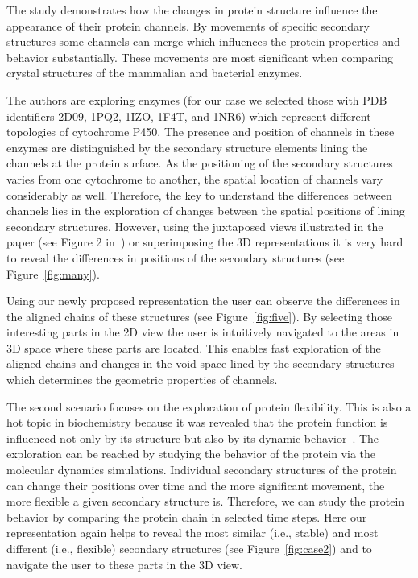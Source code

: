 \documentclass[twocolumn]{bmcart}%
\begin{document}
The study demonstrates how the changes in protein structure influence the appearance of their protein channels.
By movements of specific secondary structures some channels can merge which influences the protein properties and behavior substantially.
These movements are most significant when comparing crystal structures of the mammalian and bacterial enzymes.

The authors are exploring enzymes (for our case we selected those with PDB identifiers 2D09, 1PQ2, 1IZO, 1F4T, and 1NR6) which represent different topologies of cytochrome P450. 
The presence and position of channels in these enzymes are distinguished by the secondary structure elements lining the channels at the protein surface. 
As the positioning of the secondary structures varies from one cytochrome to another, the spatial location of channels vary considerably as well.
Therefore, the key to understand the differences between channels lies in the exploration of changes between the spatial positions of lining secondary structures.
However, using the juxtaposed views illustrated in the paper (see Figure 2 in~\cite{Cojocaru2007}) or superimposing the 3D representations it is very hard to reveal the differences in positions of the secondary structures (see Figure~\ref{fig:many}).

Using our newly proposed representation the user can observe the differences in the aligned chains of these structures (see Figure~\ref{fig:five}).
By selecting those interesting parts in the 2D view the user is intuitively navigated to the areas in 3D space where these parts are located.
This enables fast exploration of the aligned chains and changes in the void space lined by the secondary structures which determines the geometric properties of channels.


The second scenario focuses on the exploration of protein flexibility.
This is also a hot topic in biochemistry because it was revealed that the protein function is influenced not only by its structure but also by its dynamic behavior~\cite{Hensen2012}.
The exploration can be reached by studying the behavior of the protein via the molecular dynamics simulations.
Individual secondary structures of the protein can change their positions over time and the more significant movement, the more flexible a given secondary structure is.
Therefore, we can study the protein behavior by comparing the protein chain in selected time steps.
Here our representation again helps to reveal the most similar (i.e., stable) and most different (i.e., flexible) secondary structures (see Figure~\ref{fig:case2}) and to navigate the user to these parts in the 3D view.
\end{document}
